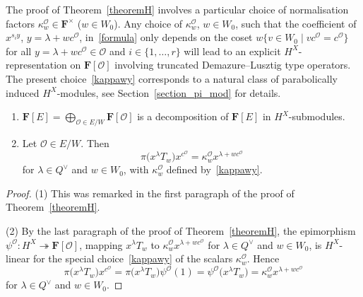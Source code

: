 \begin{Remark}\label{H_remark}
The proof of Theorem~\ref{theoremH} involves a particular choice of normalisation factors $\kappa_w^{\mathcal{O}}\in\mathbf{F}^\times$ ($w\in W_0$). Any choice of $\kappa_w^\mathcal{O}$, $w\in W_0$, such that the coefficient of $x^{s_iy}$, ${y=\lambda+wc^{\mathcal{O}}}$, in~\eqref{formula} only depends on the coset $w\{v\in W_0 \mid vc^\mathcal{O}=c^\mathcal{O}\}$ for all ${y=\lambda+wc^\mathcal{O}\in\mathcal{O}}$ and ${i\in\{1,\dots,r\}}$
will lead to an explicit $H^X$-representation on $\mathbf{F}[\mathcal{O}]$ involving truncated Demazure--Lusztig type operators. The present choice~\eqref{kappawy} corresponds to a natural class of parabolically induced $H^X$-modules,
see Section~\ref{section_pi_mod} for details.
\end{Remark}
\begin{Corollary}\label{corpsi}\hfill
\begin{enumerate}\itemsep=0pt
\item[$(1)$] $\mathbf{F}[E]=\bigoplus_{\mathcal{O}\in E/W}\mathbf{F}[\mathcal{O}]$ is a decomposition of $\mathbf{F}[E]$ in $H^X$-submodules.
\item[$(2)$] Let $\mathcal{O}\in E/W$. Then
\begin{equation*}%
\pi\bigl(x^\lambda T_w\bigr)x^{c^\mathcal{O}}=\kappa_w^\mathcal{O}x^{\lambda+wc^\mathcal{O}}
\end{equation*}
for $\lambda\in Q^\vee$ and $w\in W_0$,
with $\kappa_w^\mathcal{O}$ defined by~\eqref{kappawy}.
\end{enumerate}
\end{Corollary}

 \begin{proof}
 (1) This was remarked in the first paragraph of the proof of Theorem~\ref{theoremH}.

(2) By the last paragraph of the proof of Theorem~\ref{theoremH}, the epimorphism $\psi^\mathcal{O}\colon H^X\twoheadrightarrow\mathbf{F}[\mathcal{O}]$, mapping
$x^\lambda T_w$ to $\kappa_w^\mathcal{O}x^{\lambda+wc^\mathcal{O}}$ for $\lambda\in Q^\vee$ and $w\in W_0$, is $H^X$-linear for the special choice~\eqref{kappawy} of the scalars $\kappa_w^\mathcal{O}$. Hence
\[
\pi\bigl(x^\lambda T_w\bigr)x^{c^\mathcal{O}}=\pi\bigl(x^\lambda T_w\bigr)\psi^\mathcal{O}(1)=\psi^\mathcal{O}\bigl(x^\lambda T_w\bigr)=
\kappa_w^\mathcal{O}x^{\lambda+wc^\mathcal{O}}
\]
for $\lambda\in Q^\vee$ and $w\in W_0$.
 \end{proof}

